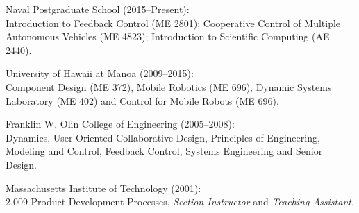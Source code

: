 
\begin{cvitems}
  \item Naval Postgraduate School (2015--Present):\\
        Introduction to Feedback Control (ME 2801); Cooperative Control of Multiple Autonomous Vehicles (ME 4823); Introduction to Scientific Computing (AE 2440).
  \item University of Hawaii at Manoa (2009--2015):\\
        Component Design (ME 372), Mobile Robotics (ME 696), Dynamic Systems Laboratory (ME 402) and Control for Mobile Robots (ME 696).
  \item Franklin W. Olin College of Engineering (2005--2008):\\
        Dynamics, User Oriented Collaborative Design, Principles of Engineering, Modeling and Control, Feedback Control, Systems Engineering and Senior Design.
  \item Massachusetts Institute of Technology (2001):\\
        2.009 Product Development Processes, \emph{Section Instructor} and \emph{Teaching Assistant}.
\end{cvitems}

